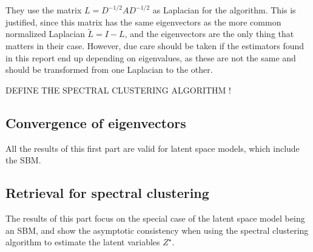 \documentclass[../../main.tex]{subfiles} %
\begin{document}
 They use the matrix \(L = D^{-1/2} A 
D^{-1/2}\) as Laplacian for the algorithm. This is justified, since this matrix 
has the same eigenvectors as the more common normalized Laplacian \(\tilde L = 
I - L\), and the eigenvectors are the only thing that matters in their case. 
However, due care should be taken if the estimators found in this report end up 
depending on eigenvalues, as these are not the same and should be transformed 
from one Laplacian to the other.

DEFINE THE SPECTRAL CLUSTERING ALGORITHM !

\subsection{Convergence of eigenvectors}
All the results of this first part are valid for latent space models, which 
include the SBM.

\subsection{Retrieval for spectral clustering}
The results of this part focus on the special case of the latent space model 
being an SBM, and show the asymptotic consistency when using the spectral 
clustering algorithm to estimate the latent variables \(Z^{\star}\).
\end{document}
